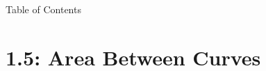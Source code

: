 

 \begin{frame}{Table of Contents }
\mapofcontentsA{\ae,\aapp}
 \end{frame}
\section{1.5: Area Between Curves}
